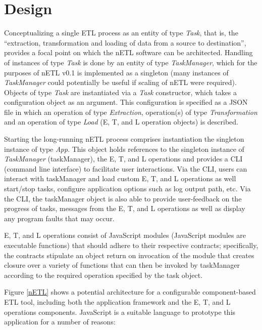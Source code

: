 \section{Design}
Conceptualizing a single ETL process as an entity of type \textit{Task}, that is, the ``extraction, transformation and loading of data from a source to destination'', provides a focal point on which the nETL software can be architected. Handling of instances of type \textit{Task} is done by an entity of type \textit{TaskManager}, which for the purposes of nETL v0.1 is implemented as a singleton (many instances of \textit{TaskManager} could potentially be useful if scaling of nETL were required). Objects of type \textit{Task} are instantiated via a \textit{Task} constructor, which takes a configuration object as an argument. This configuration is specified as a JSON file in which an operation of type \textit{Extraction}, operation(s) of type \textit{Transformation} and an operation of type \textit{Load} (E, T, and L operation objects) is described.

Starting the long-running nETL process comprises instantiation the singleton instance of type \textit{App}. This object holds references to the singleton instance of \textit{TaskManager} (taskManager), the E, T, and L operations and provides a CLI (command line interface) to facilitate user interactions. Via the CLI, users can interact with taskManager and load custom E, T, and L operations as well start/stop tasks, configure application options such as log output path, etc. Via the CLI, the taskManager object is also able to provide user-feedback on the progress of tasks, messages from the E, T, and L operations as well as display any program faults that may occur.

E, T, and L operations consist of JavaScript modules (JavaScript modules are executable functions) that should adhere to their respective contracts; specifically, the contracts stipulate an object return on invocation of the module that creates closure over a variety of functions that can then be invoked by taskManager according to the required operation specified by the task object.



Figure \ref{nETL} shows a potential architecture for a configurable component-based ETL tool, including both the application framework and the E, T, and L operations components. JavaScript is a suitable language to prototype this application for a number of reasons:


